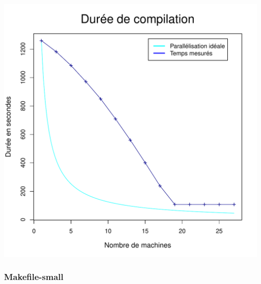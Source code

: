\documentclass[a4paper, 11pt, titlepage]{article}
\begin{document}
\begin{center}
    \includegraphics[scale=0.45]{res/sujet_makefiles_premier_Makefile_nth1.pdf}
\end{center}


\subsubsection* {Makefile-small}
\end{document}
